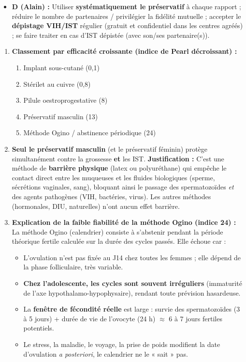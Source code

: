 \documentclass[11pt]{article}
\begin{document}
\begin{corrige}
\begin{enumerate}
\begin{itemize}
\item \textbf{D (Alain) :} Utiliser \textbf{systématiquement le préservatif} à chaque rapport ; réduire le nombre de partenaires / privilégier la fidélité mutuelle ; accepter le \textbf{dépistage VIH/IST} régulier (gratuit et confidentiel dans les centres agréés) ; se faire traiter en cas d'IST dépistée (avec son/ses partenaire(s)).
\end{itemize}
\end{enumerate}
\end{corrige}

\begin{corrige}
\begin{enumerate}
\item \textbf{Classement par efficacité croissante (indice de Pearl décroissant) :}
\begin{enumerate}
\item Implant sous-cutané (0,1)
\item Stérilet au cuivre (0,8)
\item Pilule oestroprogestative (8)
\item Préservatif masculin (13)
\item Méthode Ogino / abstinence périodique (24)
\end{enumerate}
\item \textbf{Seul le préservatif masculin} (et le préservatif féminin) protège simultanément contre la grossesse \textbf{et} les IST.
\textbf{Justification :} C'est une méthode de \textbf{barrière physique} (latex ou polyuréthane) qui empêche le contact direct entre les muqueuses et les fluides biologiques (sperme, sécrétions vaginales, sang), bloquant ainsi le passage des spermatozoïdes \emph{et} des agents pathogènes (VIH, bactéries, virus). Les autres méthodes (hormonales, DIU, naturelles) n'ont aucun effet barrière.
\item \textbf{Explication de la faible fiabilité de la méthode Ogino (indice 24) :}
La méthode Ogino (calendrier) consiste à s'abstenir pendant la période théorique fertile calculée sur la durée des cycles passés. Elle échoue car :
\begin{itemize}
\item L'ovulation n'est pas fixée au J14 chez toutes les femmes ; elle dépend de la phase folliculaire, très variable.
\item \textbf{Chez l'adolescente, les cycles sont souvent irréguliers} (immaturité de l'axe hypothalamo-hypophysaire), rendant toute prévision hasardeuse.
\item La \textbf{fenêtre de fécondité réelle} est large : survie des spermatozoïdes (3 à 5 jours) + durée de vie de l'ovocyte (24 h) $\approx$ 6 à 7 jours fertiles potentiels.
\item Le stress, la maladie, le voyage, la prise de poids modifient la date d'ovulation \emph{a posteriori}, le calendrier ne le « sait » pas.
\end{itemize}
\end{enumerate}
\end{corrige}
\end{document}
